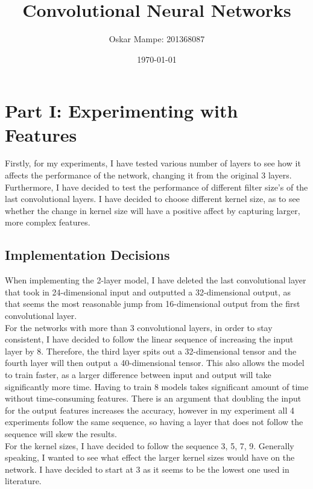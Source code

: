 \documentclass{article}
\author{Oskar Mampe: 201368087}
\date{\today}
\title{Convolutional Neural Networks}
\begin{document}
    \maketitle
    \tableofcontents

    \section{Part I: Experimenting with Features}


    Firstly, for my experiments, I have tested various number of layers to see how it affects the performance of the network, changing it from the original 3 layers. Furthermore, I have decided to test the performance of different filter size's of the last convolutional layers.  I have decided to choose different kernel size, as to see whether the change in kernel size will have a positive affect by capturing larger, more complex features.\\


    \subsection{Implementation Decisions}

    When implementing the 2-layer model, I have deleted the last convolutional layer that took in 24-dimensional input and outputted a 32-dimensional output, as that seems the most reasonable jump from 16-dimensional output from the first convolutional layer.\\

    For the networks with more than 3 convolutional layers, in order to stay consistent, I have decided to follow the linear sequence of increasing the input layer by 8. Therefore, the third layer spits out a 32-dimensional tensor and the fourth layer will then output a 40-dimensional tensor. This also allows the model to train faster, as a larger difference between input and output will take significantly more time. Having to train 8 models takes significant amount of time without time-consuming features. There is an argument that doubling the input for the output features increases the accuracy, however in my experiment all 4 experiments follow the same sequence, so having a layer that does not follow the sequence will skew the results.\\

    For the kernel sizes, I have decided to follow the sequence 3, 5, 7, 9. Generally speaking, I wanted to see what effect the larger kernel sizes would have on the network. I have decided to start at 3 as it seems to be the lowest one used in literature.\\
\end{document}
